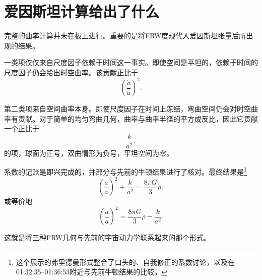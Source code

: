 \section{爱因斯坦计算给出了什么}

完整的曲率计算并未在板上进行。重要的是将FRW度规代入爱因斯坦张量后所出现的结果。

一类项仅仅来自尺度因子依赖于时间这一事实。即使空间是平坦的，依赖于时间的尺度因子仍会给出时空曲率。该贡献正比于
\begin{equation}
\left(\frac{\dot a}{a}\right)^2.
\end{equation}

第二类项来自空间曲率本身。即使尺度因子在时间上冻结，弯曲空间仍会对时空曲率有贡献。对于简单的均匀弯曲几何，曲率与曲率半径的平方成反比，因此它贡献一个正比于
\begin{equation}
\frac{k}{a^2},
\end{equation}
的项，球面为正号，双曲情形为负号，平坦空间为零。

\begin{classroomqa}
\end{classroomqa}

系数的记账是即兴完成的，并部分与先前的牛顿结果进行了核对。最终结果是\footnote{这个展示的弗里德曼形式整合了口头的、自我修正的系数讨论，以及在01:32:35--01:36:53附近与先前牛顿结果的比较。}
\begin{equation}
\left(\frac{\dot a}{a}\right)^2+\frac{k}{a^2}=\frac{8\pi G}{3}\rho,
\end{equation}
或等价地
\begin{equation}
\left(\frac{\dot a}{a}\right)^2=\frac{8\pi G}{3}\rho-\frac{k}{a^2}.
\end{equation}

这就是将三种FRW几何与先前的宇宙动力学联系起来的那个形式。

\begin{classroomqa}
\end{classroomqa}

\begin{classroomqa}
\end{classroomqa}


